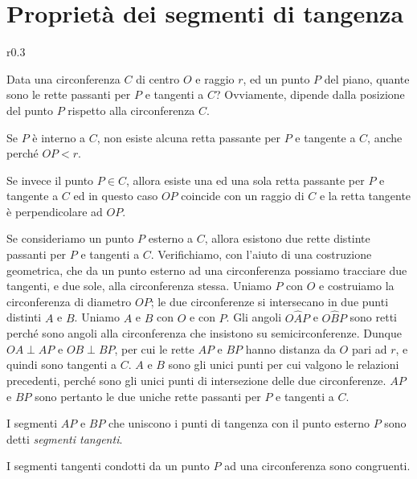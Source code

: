 \section{Proprietà dei segmenti di 
tangenza}\label{sect:proprieta_tangenti}

\begin{wrapfigure}{r}{0.3\textwidth}
	
\centering\vspace{20pt}
\end{wrapfigure}
Data una circonferenza $C$ di centro $O$ e raggio $r$, ed un punto 
$P$ del piano, quante sono le rette passanti per $P$ e tangenti a $C$? 
 Ovviamente, dipende dalla posizione del punto $P$ rispetto alla 
circonferenza $C$.

Se $P$ è interno a $C$, non esiste alcuna retta passante per $P$ e 
tangente a $C$, anche perché $OP < r$.

Se invece il punto $P\in C$, allora esiste una ed una sola retta 
passante per $P$ e tangente a $C$ ed in questo caso $OP$ coincide con 
un raggio di $C$ e la retta tangente è perpendicolare ad $OP$.

Se consideriamo un punto $P$ esterno a $C$, allora esistono due rette 
distinte passanti per $P$ e tangenti a $C$. Verifichiamo, con l'aiuto 
di una costruzione geometrica, che da un punto esterno ad una 
circonferenza possiamo tracciare due tangenti, e due sole, alla 
circonferenza stessa.
Uniamo $P$ con $O$ e costruiamo la circonferenza di diametro $OP$; le 
due circonferenze si intersecano in due punti distinti $A$ e $B$. 
Uniamo $A$ e $B$ con $O$ e con $P$. Gli angoli $O\widehat{A}P$ e 
$O\widehat{B}P$ sono retti perché sono angoli alla circonferenza che 
insistono su semicirconferenze. Dunque $OA\perp AP$ e $OB\perp BP$, 
per cui le rette $AP$ e $BP$ hanno distanza da $O$ pari ad $r$, e 
quindi sono tangenti a $C$. $A$ e $B$ sono gli unici punti per cui 
valgono le relazioni precedenti, perché sono gli unici punti di 
intersezione delle due circonferenze. $AP$ e $BP$ sono pertanto le 
due uniche rette passanti per $P$ e tangenti a $C$.

I segmenti $AP$ e $BP$ che uniscono i punti di tangenza con il punto 
esterno $P$ sono detti \emph{segmenti tangenti}.

\begin{teorema}
I segmenti tangenti condotti da un punto $P$ ad una circonferenza 
sono congruenti.
\end{teorema}

